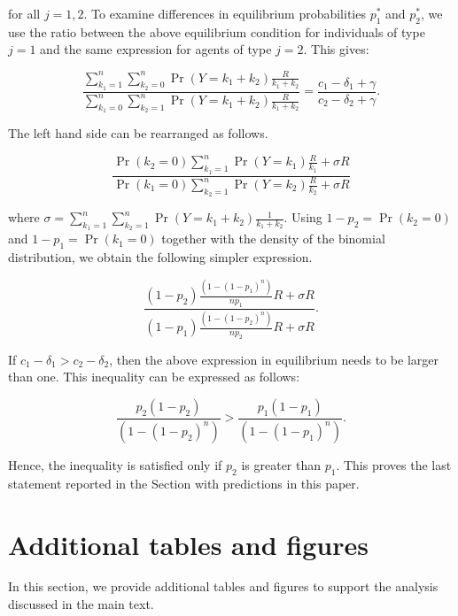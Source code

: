 \documentclass[11pt, titlepage]{article}
\begin{document}
for all \(j=1,2\). To examine differences in equilibrium probabilities
\(p_1^*\) and \(p_2^*\), we use the ratio between the above equilibrium
condition for individuals of type \(j=1\) and the same expression for
agents of type \(j=2\). This gives:

\begin{equation}
\frac{\sum_{k_1=1}^n \sum_{k_2=0}^n \Pr(Y=k_1+k_2) \frac{R}{k_1+k_2}}{\sum_{k_1=0}^n \sum_{k_2=1}^n \Pr(Y=k_1+k_2) \frac{R}{k_1+k_2}} = \frac{c_1 -\delta_1 + \gamma}{c_2 -\delta_2 + \gamma}.
\end{equation}

The left hand side can be rearranged as follows.

\begin{equation}
\frac{\Pr(k_2=0) \sum_{k_1=1}^n\Pr(Y=k_1)\frac{R}{k_1} +  \sigma R}{\Pr(k_1=0) \sum_{k_2=1}^n\Pr(Y=k_2)\frac{R}{k_2} +  \sigma R} 
\end{equation}

where
\(\sigma = \sum_{k_1=1}^n \sum_{k_2=1}^n \Pr(Y=k_1+k_2) \frac{1}{k_1+k_2}\).
Using \(1-p_2=\Pr(k_2=0)\) and \(1-p_1=\Pr(k_1=0)\) together with the
density of the binomial distribution, we obtain the following simpler
expression.

\begin{equation}
\frac{(1-p_2) \frac{(1- (1-p_1)^n)}{n p_1} R +  \sigma R }{(1-p_1) \frac{(1- (1-p_2)^n)}{n p_2} R +  \sigma R}  .
\end{equation}

If \(c_1 - \delta_1 > c_2 - \delta_2\), then the above expression in
equilibrium needs to be larger than one. This inequality can be
expressed as follows:

\begin{equation}
\frac{p_2 (1-p_2)}{(1- (1-p_2)^n)}  > \frac{p_1 (1-p_1)}{(1- (1-p_1)^n)}.
\end{equation}

Hence, the inequality is satisfied only if \(p_2\) is greater than
\(p_1\). This proves the last statement reported in the Section with
predictions in this paper.

\section{Additional tables and
figures}\label{additional-tables-and-figures}

In this section, we provide additional tables and figures to support the
analysis discussed in the main text.
\end{document}
